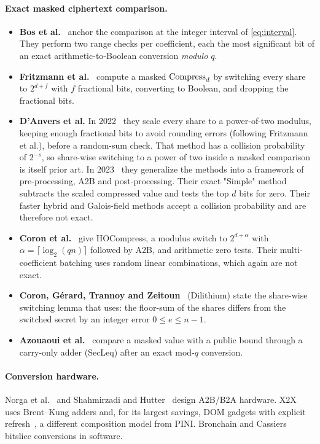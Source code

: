 \paragraph{Exact masked ciphertext comparison.}
\begin{itemize}
  \item \textbf{Bos et al.}~\cite{bos2021masking} anchor the comparison at the integer interval of \cref{eq:interval}. They perform two range checks per coefficient, each the most significant bit of an exact arithmetic-to-Boolean conversion \emph{modulo $q$}.
  \item \textbf{Fritzmann et al.}~\cite{fritzmann2022} compute a masked $\operatorname{Compress}_d$ by switching every share to $2^{d+f}$ with $f$ fractional bits, converting to Boolean, and dropping the fractional bits.
  \item \textbf{D'Anvers et al.} In 2022~\cite{danvers2022} they scale every share to a power-of-two modulus, keeping enough fractional bits to avoid rounding errors (following Fritzmann et al.), before a random-sum check. That method has a collision probability of $2^{-s}$, so share-wise switching to a power of two inside a masked comparison is itself prior art. In 2023~\cite{danvers2023} they generalize the methods into a framework of pre-processing, A2B and post-processing. Their exact "Simple" method subtracts the scaled compressed value and tests the top $d$ bits for zero. Their faster hybrid and Galois-field methods accept a collision probability and are therefore not exact.
  \item \textbf{Coron et al.}~\cite{coron2023poly} give HOCompress, a modulus switch to $2^{d+\alpha}$ with $\alpha = \lceil \log_2(qn) \rceil$ followed by A2B, and arithmetic zero tests. Their multi-coefficient batching uses random linear combinations, which again are not exact.
  \item \textbf{Coron, G\'erard, Trannoy and Zeitoun}~\cite{coron2023dil} (Dilithium) state the share-wise switching lemma that \PAMS{} uses: the floor-sum of the shares differs from the switched secret by an integer error $0 \le e \le n-1$.
  \item \textbf{Azouaoui et al.}~\cite{azouaoui2023} compare a masked value with a public bound through a carry-only adder (SecLeq) after an exact mod-$q$ conversion.
\end{itemize}

\paragraph{Conversion hardware.} Norga et al.~\cite{norga2024x2x} and Shahmirzadi and Hutter~\cite{shahmirzadi2024} design A2B/B2A hardware. X2X uses Brent--Kung adders and, for its largest savings, DOM gadgets with explicit refresh~\cite{gross2016dom}, a different composition model from PINI. Bronchain and Cassiers~\cite{bronchain2022} bitslice conversions in software.

